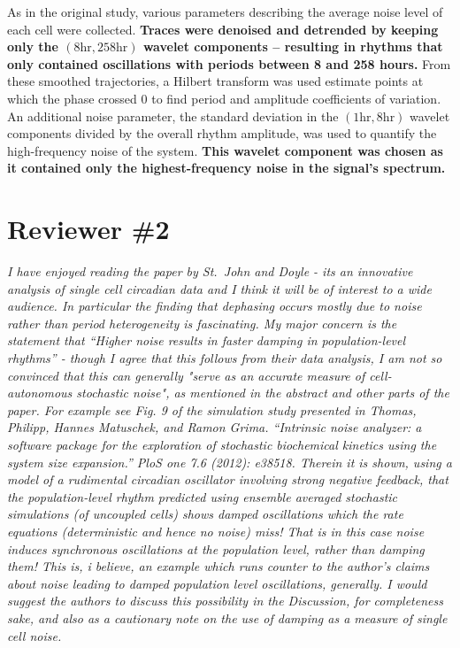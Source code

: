 \documentclass[11pt, letterpaper]{article}
\newenvironment{reviewer}{\itshape\color{gray}}{}
\newenvironment{manuscript}[1]{\begin{center}\begin{tcolorbox}[colback=green!5!white,colframe=green!75!black,width=\textwidth,title={#1},breakable,fonttitle=\bfseries]}{\end{tcolorbox}\end{center}}
\begin{document}
\begin{manuscript}{Page 10}
As in the original study, various parameters describing the average noise level of each cell were collected.
{\bfseries
Traces were denoised and detrended by keeping only the $(8 \text{hr}, 258 \text{hr})$ wavelet components -- resulting in rhythms that only contained oscillations with periods between 8 and 258 hours.
}
From these smoothed trajectories, a Hilbert transform was used estimate points at which the phase crossed $0$ to find period and amplitude coefficients of variation.
An additional noise parameter, the standard deviation in the $(1 \text{hr}, 8 \text{hr})$ wavelet components divided by the overall rhythm amplitude, was used to quantify the high-frequency noise of the system.
{\bfseries
This wavelet component was chosen as it contained only the highest-frequency noise in the signal's spectrum.
}
\end{manuscript}

\section*{Reviewer \#2}
\begin{reviewer}
I have enjoyed reading the paper by St.\ John and Doyle - its an innovative analysis of single cell circadian data and I think it will be of interest to a wide audience. 
In particular the finding that dephasing occurs mostly due to noise rather than period heterogeneity is fascinating. 
My major concern is the statement that ``Higher noise results in faster damping in population-level rhythms'' - though I agree that this follows from their data analysis, I am not so convinced that this can generally "serve as an accurate measure of cell-autonomous stochastic noise", as mentioned in the abstract and other parts of the paper. 
For example see Fig. 9 of the simulation study presented in Thomas, Philipp, Hannes Matuschek, and Ramon Grima. 
``Intrinsic noise analyzer: a software package for the exploration of stochastic biochemical kinetics using the system size expansion.'' PloS one 7.6 (2012): e38518.
Therein it is shown, using a model of a rudimental circadian oscillator involving strong negative feedback, that the population-level rhythm predicted using ensemble averaged stochastic simulations (of uncoupled cells) shows damped oscillations which the rate equations (deterministic and hence no noise) miss!
That is in this case noise induces synchronous oscillations at the population level, rather than damping them! This is, i believe, an example which runs counter to the author's claims about noise leading to damped population level oscillations, generally. 
I would suggest the authors to discuss this possibility in the Discussion, for completeness sake, and also as a cautionary note on the use of damping as a measure of single cell noise.
\end{reviewer}
\end{document}
